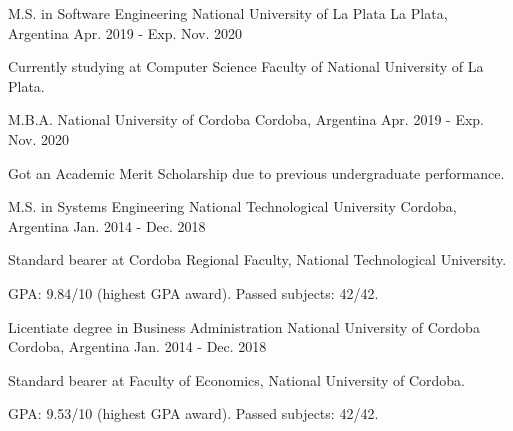 

\begin{cventries}

  \cventry
    {M.S. in Software Engineering} %
    {National University of La Plata} %
    {La Plata, Argentina} %
    {Apr. 2019 - Exp. Nov. 2020} %
    {
      \begin{cvitems} %
        \item {Currently studying at Computer Science Faculty of National University of La Plata.}
      \end{cvitems}
    }

  \cventry
    {M.B.A.} %
    {National University of Cordoba} %
    {Cordoba, Argentina} %
    {Apr. 2019 - Exp. Nov. 2020} %
    {
      \begin{cvitems} %
        \item {Got an Academic Merit Scholarship due to previous undergraduate performance.}
      \end{cvitems}
    }

  \cventry
    {M.S. in Systems Engineering} %
    {National Technological University} %
    {Cordoba, Argentina} %
    {Jan. 2014 - Dec. 2018} %
    {
      \begin{cvitems} %
        \item {Standard bearer at Cordoba Regional Faculty, National Technological University.}
        \item {GPA: 9.84/10 (highest GPA award). Passed subjects: 42/42.}
      \end{cvitems}
    }

  \cventry
    {Licentiate degree in Business Administration} %
    {National University of Cordoba} %
    {Cordoba, Argentina} %
    {Jan. 2014 - Dec. 2018} %
    {
      \begin{cvitems} %
        \item {Standard bearer at Faculty of Economics, National University of Cordoba.}
        \item {GPA: 9.53/10 (highest GPA award). Passed subjects: 42/42.}
      \end{cvitems}
    }

\end{cventries}
